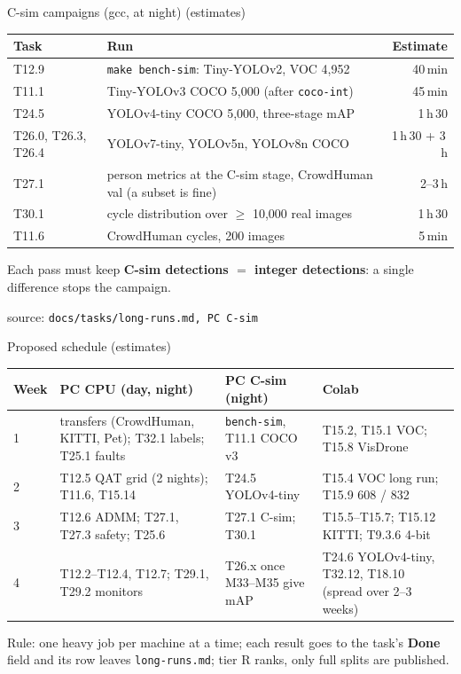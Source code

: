\documentclass[aspectratio=169,11pt]{beamer}
\newcommand\src[1]{\par\vfill{\tiny\color{gray}source: \texttt{#1}}}
\newcommand\plan{\textcolor{orange!80!black}{\small(estimates)}}
\begin{document}
\begin{frame}{C-sim campaigns (gcc, at night) \plan}
  \footnotesize
  \begin{tabularx}{\linewidth}{@{}l>{\raggedright\arraybackslash}Xr@{}}
    \toprule
    Task & Run & Estimate \\
    \midrule
    T12.9 & \texttt{make bench-sim}: Tiny-YOLOv2, VOC 4,952 & 40\,min \\
    T11.1 & Tiny-YOLOv3 COCO 5,000 (after \texttt{coco-int}) & 45\,min \\
    T24.5 & YOLOv4-tiny COCO 5,000, three-stage mAP & 1\,h\,30 \\
    T26.0, T26.3, T26.4 & YOLOv7-tiny, YOLOv5n, YOLOv8n COCO & 1\,h\,30 + 3\,h \\
    T27.1 & person metrics at the C-sim stage, CrowdHuman val (a subset is fine) & 2--3\,h \\
    T30.1 & cycle distribution over $\ge$ 10,000 real images & 1\,h\,30 \\
    T11.6 & CrowdHuman cycles, 200 images & 5\,min \\
    \bottomrule
  \end{tabularx}

  \medskip\small
  Each pass must keep \textbf{C-sim detections $=$ integer detections}: a single difference
  stops the campaign.
  \src{docs/tasks/long-runs.md, PC C-sim}
\end{frame}

\begin{frame}{Proposed schedule \plan}
  \scriptsize
  \begin{tabularx}{\linewidth}{@{}l>{\raggedright\arraybackslash}X>{\raggedright\arraybackslash}X>{\raggedright\arraybackslash}X@{}}
    \toprule
    Week & PC CPU (day, night) & PC C-sim (night) & Colab \\
    \midrule
    1 & transfers (CrowdHuman, KITTI, Pet); T32.1 labels; T25.1 faults & \texttt{bench-sim}, T11.1 COCO v3 & T15.2, T15.1 VOC; T15.8 VisDrone \\
    2 & T12.5 QAT grid (2 nights); T11.6, T15.14 & T24.5 YOLOv4-tiny & T15.4 VOC long run; T15.9 608 / 832 \\
    3 & T12.6 ADMM; T27.1, T27.3 safety; T25.6 & T27.1 C-sim; T30.1 & T15.5--T15.7; T15.12 KITTI; T9.3.6 4-bit \\
    4 & T12.2--T12.4, T12.7; T29.1, T29.2 monitors & T26.x once M33--M35 give mAP & T24.6 YOLOv4-tiny, T32.12, T18.10 (spread over 2--3 weeks) \\
    \bottomrule
  \end{tabularx}

  \medskip\small
  Rule: one heavy job per machine at a time; each result goes to the task's \textbf{Done} field
  and its row leaves \texttt{long-runs.md}; tier R ranks, only full splits are published.
\end{frame}
\end{document}
